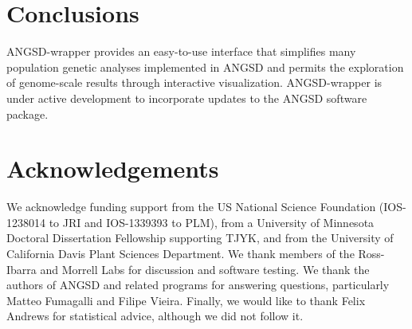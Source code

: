 \documentclass[10pt,a4paper]{article}
\begin{document}
\section*{Conclusions}
ANGSD-wrapper provides an easy-to-use interface that simplifies many population genetic analyses implemented in ANGSD \citep{korneliussen2014angsd} and permits the exploration of genome-scale results through interactive visualization.
ANGSD-wrapper is under active development to incorporate updates to the ANGSD software package.  
\section*{Acknowledgements}
We acknowledge funding support from the US National Science Foundation (IOS-1238014 to JRI and IOS-1339393 to PLM), from a University of Minnesota Doctoral Dissertation Fellowship supporting TJYK, and from the University of California Davis Plant Sciences Department. We thank members of the Ross-Ibarra and Morrell Labs for discussion and software testing. We thank the authors of ANGSD and related programs for answering questions, particularly Matteo Fumagalli and Filipe Vieira. Finally, we would like to thank Felix Andrews for statistical advice, although we did not follow it. 
\clearpage




\end{document}
